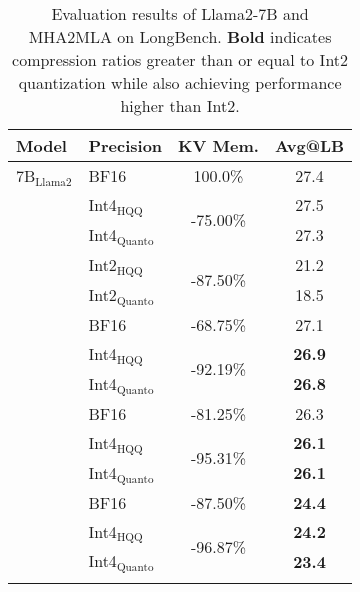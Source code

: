 \begin{table}[t]
\centering
\begin{tabular}{l@{\hskip 5pt}p{2cm}@{\hskip 5pt}c@{\hskip 5pt}c}
  \toprule
  {\textbf{Model}} & \textbf{Precision} & \textbf{KV Mem.} & \textbf{Avg@LB} \\
  \midrule
  \rowcolor{gray!10}7B$_{\text{Llama2}}$
  & \raggedright BF16 & 100.0\% & 27.4 \\
  & \raggedright Int4$_{\text{HQQ}}$ & \multirow{2}{*}{-75.00\%} 
  & 27.5 \\
  & \raggedright Int4$_{\text{Quanto}}$ & & 27.3 \\
    \arrayrulecolor{gray!20}
  \hline

  & \raggedright Int2$_{\text{HQQ}}$ & \multirow{2}{*}{-87.50\%} & 21.2 \\
  & \raggedright Int2$_{\text{Quanto}}$ &  & 18.5 \\
  \arrayrulecolor{black}
  \hline
  \multirow{3}{*}{~$d_{kv}\!=\!64$} 
  & \raggedright BF16 & -68.75\% & 27.1 \\
  \arrayrulecolor{gray!20}
  \hline
  & \raggedright Int4$_{\text{HQQ}}$ & \multirow{2}{*}{-92.19\%}  & \bf 26.9 \\
  & \raggedright Int4$_{\text{Quanto}}$ & & \bf 26.8 \\
  \arrayrulecolor{black}
  \hline
  \multirow{3}{*}{~$d_{kv}\!=\!32$} 
  & \raggedright BF16 & -81.25\% & 26.3 \\
  \arrayrulecolor{gray!20}
  \hline
  & \raggedright Int4$_{\text{HQQ}}$ & \multirow{2}{*}{-95.31\%}  &\bf  26.1 \\
  & \raggedright Int4$_{\text{Quanto}}$ &  & \bf 26.1 \\
  \arrayrulecolor{black}
  \hline
  \multirow{3}{*}{~$d_{kv}\!=\!16$} 
  & \raggedright BF16 & -87.50\% & \bf 24.4 \\
  \arrayrulecolor{gray!20}
  \hline
  & \raggedright Int4$_{\text{HQQ}}$ & \multirow{2}{*}{-96.87\%}   & \bf 24.2 \\
  & \raggedright Int4$_{\text{Quanto}}$ &  & \bf 23.4 \\
  \arrayrulecolor{black}
    \bottomrule
\end{tabular}
\caption{Evaluation results of Llama2-7B and MHA2MLA on LongBench. \textbf{Bold} indicates compression ratios greater than or equal to Int2 quantization while also achieving performance higher than Int2.}
\vspace{-0.3cm}
\label{tab:long_bench}
\end{table}